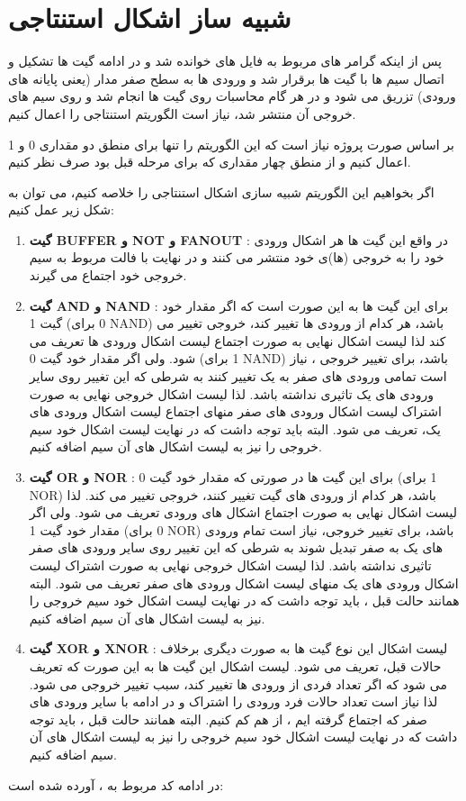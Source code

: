 \section{شبیه ساز اشکال استنتاجی}
پس از اینکه گرامر های مربوط به فایل های 
خوانده شد و در ادامه گیت ها تشکیل و اتصال سیم ها با گیت ها برقرار شد و ورودی ها به سطح صفر مدار (یعنی پایانه های ورودی) تزریق می شود و در هر گام محاسبات روی گیت ها انجام شد و روی سیم های خروجی آن منتشر شد، نیاز است الگوریتم استنتاجی را اعمال کنیم. 

بر اساس صورت پروژه نیاز است که این الگوریتم را تنها برای منطق دو مقداری 0 و 1 اعمال کنیم و از منطق چهار مقداری که برای مرحله قبل بود صرف نظر کنیم. 

اگر بخواهیم این الگوریتم شبیه سازی اشکال استنتاجی را خلاصه کنیم، می توان به شکل زیر عمل کنیم:

\begin{enumerate}
	\item 
	\textbf{گیت BUFFER و NOT و FANOUT}
	: در واقع این گیت ها هر اشکال ورودی خود را به خروجی (ها)ی خود منتشر می کنند و در نهایت با فالت مربوط به سیم خروجی خود اجتماع می گیرند.
	
	\item
	\textbf{گیت AND و NAND}
	: برای این گیت ها به این صورت است که اگر مقدار خود گیت 1 (0 برای NAND) باشد، هر کدام از ورودی ها تغییر کند، خروجی تغییر می کند لذا لیست اشکال نهایی به صورت اجتماع لیست اشکال ورودی ها تعریف می شود. ولی اگر مقدار خود گیت 0 (1 برای NAND) باشد، برای تغییر خروجی ، نیاز است تمامی ورودی های صفر به یک تغییر کنند به شرطی که این تغییر روی سایر ورودی های یک تاثیری نداشته باشد. لذا لیست اشکال خروجی نهایی به صورت اشتراک لیست اشکال ورودی های صفر منهای اجتماع لیست اشکال ورودی های یک، تعریف می شود. البته باید توجه داشت که در نهایت لیست اشکال خود سیم خروجی را نیز به لیست اشکال های آن سیم اضافه کنیم.
	
	\item 
	\textbf{گیت OR و NOR}
	: برای این گیت ها در صورتی که مقدار خود گیت 0 (1 برای NOR) باشد، هر کدام از ورودی های گیت تغییر کنند، خروجی تغییر می کند. لذا لیست اشکال نهایی به صورت اجتماع اشکال های ورودی تعریف می شود. ولی اگر مقدار خود گیت 1 (0 برای NOR) باشد، برای تغییر خروجی، نیاز است تمام ورودی های یک به صفر تبدیل شوند به شرطی که این تغییر روی سایر ورودی های صفر تاثیری نداشته باشد. لذا لیست اشکال خروجی نهایی به صورت اشتراک لیست اشکال ورودی های یک منهای لیست اشکال ورودی های صفر تعریف می شود. البته همانند حالت قبل ، باید توجه داشت که در نهایت لیست اشکال خود سیم خروجی را نیز به لیست اشکال های آن سیم اضافه کنیم.
	
	\item
	\textbf{گیت XOR و XNOR}
	: لیست اشکال این نوع گیت ها به صورت دیگری برخلاف حالات قبل، تعریف می شود. لیست اشکال این گیت ها به این صورت که تعریف می شود که اگر تعداد فردی از ورودی ها تغییر کند، سبب تغییر خروجی می شود. لذا نیاز است تعداد حالات فرد ورودی را اشتراک و در ادامه با سایر ورودی های صفر که اجتماع گرفته ایم ، از هم کم کنیم. البته همانند حالت قبل ، باید توجه داشت که در نهایت لیست اشکال خود سیم خروجی را نیز به لیست اشکال های آن سیم اضافه کنیم.
\end{enumerate} 

در ادامه کد مربوط به 
، آورده شده است:

\small {\lr{}}

